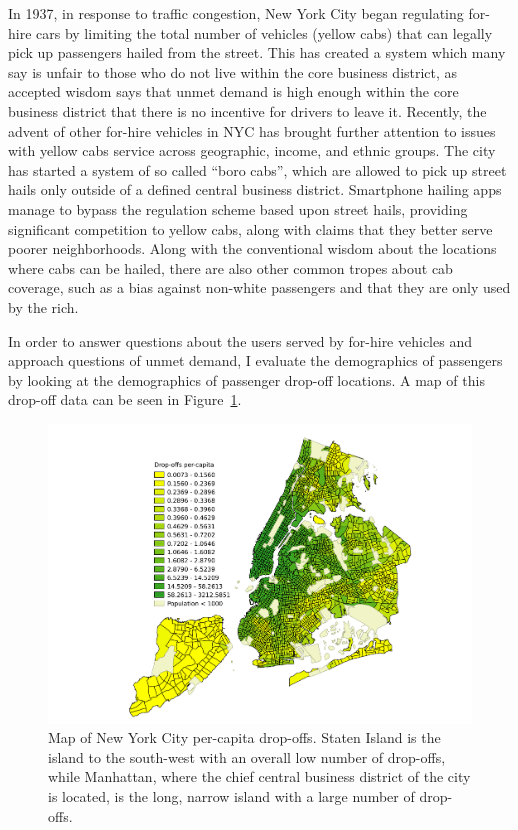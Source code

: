 \documentclass[11pt]{article}
\newcommand{\fref}[1]{Figure~\ref{fig:#1}}
\begin{document}
In 1937, in response to traffic congestion, New York City began regulating for-hire cars by limiting the total number of vehicles (yellow cabs) that can legally pick up passengers hailed from the street. This has created a system which many say is unfair to those who do not live within the core business district, as accepted wisdom says that unmet demand is high enough within the core business district that there is no incentive for drivers to leave it.
Recently, the advent of other for-hire vehicles in NYC has brought further attention to issues with yellow cabs service across geographic, income, and ethnic groups.
The city has started a system of so called ``boro cabs'', which are allowed to pick up street hails only outside of a defined central business district.
Smartphone hailing apps manage to bypass the regulation scheme based upon street hails, providing significant competition to yellow cabs, along with claims that they better serve poorer neighborhoods.
Along with the conventional wisdom about the locations where cabs can be hailed, there are also other common tropes about cab coverage, such as a bias against non-white passengers and that they are only used by the rich.

In order to answer questions about the users served by for-hire vehicles and approach questions of unmet demand, I evaluate the demographics of passengers by looking at the demographics of passenger drop-off locations. A map of this drop-off data can be seen in \fref{map}.

\begin{figure}[h]
  \centering
  \includegraphics[width=\textwidth]{2013dropoff_map2.pdf}
  \caption{Map of New York City per-capita drop-offs. Staten Island is the island to the south-west with an overall low number of drop-offs, while Manhattan, where the chief central business district of the city is located, is the long, narrow island with a large number of drop-offs. \label{fig:map}}
\end{figure}
\end{document}
